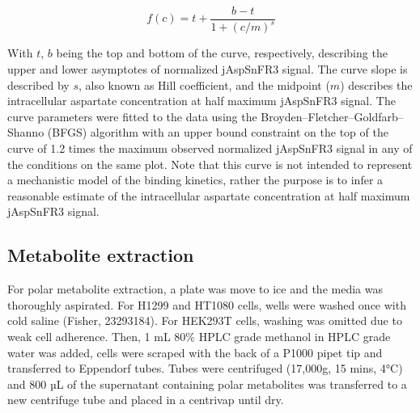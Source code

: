 \documentclass[9pt,lineno]{elife}
\begin{document}
$$
f(c) = t + \frac{b - t}{1 + (c/m)^s}
$$

With $t$, $b$ being the top and bottom of the curve, respectively, describing the upper and lower asymptotes of normalized jAspSnFR3 signal.
The curve slope is described by $s$, also known as Hill coefficient, and the midpoint ($m$) describes the intracellular aspartate concentration at half maximum jAspSnFR3 signal.
The curve parameters were fitted to the data using the Broyden–Fletcher–Goldfarb–Shanno (BFGS) algorithm with an upper bound constraint on the top of the curve of 1.2 times the maximum observed normalized jAspSnFR3 signal in any of the conditions on the same plot.
Note that this curve is not intended to represent a mechanistic model of the binding kinetics, rather the purpose is to infer a reasonable estimate of the intracellular aspartate concentration at half maximum jAspSnFR3 signal.

\subsection{Metabolite extraction}
For polar metabolite extraction, a plate was move to ice and the media was thoroughly aspirated.
For H1299 and HT1080 cells, wells were washed once with cold saline (Fisher, 23293184).
For HEK293T cells, washing was omitted due to weak cell adherence.
Then, 1 mL 80\% HPLC grade methanol in HPLC grade water was added, cells were scraped with the back of a P1000 pipet tip and transferred to Eppendorf tubes.
Tubes were centrifuged (17,000g, 15 mins, 4°C) and 800 µL of the supernatant containing polar metabolites was transferred to a new centrifuge tube and placed in a centrivap until dry.
\end{document}
